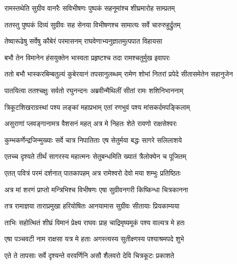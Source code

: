 \twolineshloka
{रामस्तथेति सुग्रीव वानरैः सविभीषणः}
{पुष्पकं सहनूमांश्च शीघ्रमारोह साम्प्रतम्} %

\twolineshloka
{ततस्तु पुष्पकं दिव्यं सुग्रीवः सह सेनया}
{विभीषणश्च सामात्यः सर्वे चारुरुहुर्द्रुतम्} %

\twolineshloka
{तेष्वारूढेषु सर्वेषु कौबेरं परमासनम्}
{राघवेणाभ्यनुज्ञातमुत्पपात विहायसा} %

\twolineshloka
{बभौ तेन विमानेन हंसयुक्तेन भास्वता}
{प्रहृष्टश्च तदा रामश्चतुर्मुख इवापरः} %

\fourlineindentedshloka
{ततो बभौ भास्करबिम्बतुल्यं}
{कुबेरयानं तपसानुलब्धम्}
{रामेण शोभां नितरां प्रपेदे}
{सीतासमेतेन सहानुजेन} %






\twolineshloka
{पातयित्वा ततश्चक्षुः सर्वतो रघुनन्दनः}
{अब्रवीन्मैथिलीं सीतां रामः शशिनिभाननाम्} %

\twolineshloka
{त्रिकूटशिखराग्रस्थां पश्य लङ्कां महाप्रभाम्}
{एतां रणभुवं पश्य मांसकर्दमपङ्किलाम्} %

\twolineshloka
{असुराणां प्लवङ्गानामत्र वैशसनं महत्}
{अत्र मे निहतः शेते रावणो राक्षसेश्वरः} %

\twolineshloka
{कुम्भकर्णेन्द्रजिन्मुख्याः सर्वे चात्र निपातिताः}
{एष सेतुर्मया बद्धः सागरे सलिलाशये} %

\twolineshloka
{एतच्च दृश्यते तीर्थं सागरस्य महात्मनः}
{सेतुबन्धमिति ख्यातं त्रैलोक्येन च पूजितम्} %

\twolineshloka
{एतत् पवित्रं परमं दर्शनात् पातकापहम्}
{अत्र रामेश्वरो देवो मया शम्भुः प्रतिष्ठितः} %

\twolineshloka
{अत्र मां शरणं प्राप्तो मन्त्रिभिश्च विभीषणः}
{एषा सुग्रीवनगरी किष्किन्धा चित्रकानना} %

\twolineshloka
{तत्र रामाज्ञया ताराप्रमुखा हरियोषितः}
{आनयामास सुग्रीवः सीतायाः प्रियकाम्यया} %

\twolineshloka
{ताभिः सहोत्थितं शीघ्रं विमानं प्रेक्ष्य राघवः}
{प्राह चाद्रिमृष्यमूकं पश्य वाल्यत्र मे हतः} %

\twolineshloka
{एषा पञ्चवटी नाम राक्षसा यत्र मे हताः}
{अगस्त्यस्य सुतीक्ष्णस्य पश्याश्रमपदे शुभे} %

\twolineshloka
{एते ते तापसाः सर्वे दृश्यन्ते वरवर्णिनि}
{असौ शैलवरो देवि चित्रकूटः प्रकाशते} %

